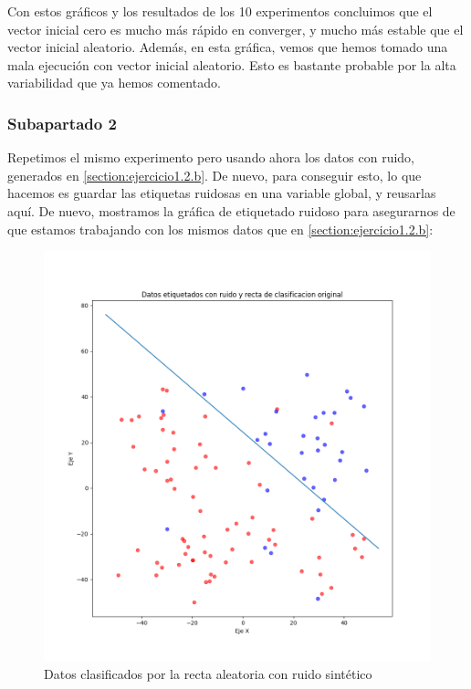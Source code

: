 \documentclass[11pt]{article}
\begin{document}
Con estos gráficos y los resultados de los 10 experimentos concluimos que el vector inicial cero es mucho más rápido en converger, y mucho más estable que el vector inicial aleatorio. Además, en esta gráfica, vemos que hemos tomado una mala ejecución con vector inicial aleatorio. Esto es bastante probable por la alta variabilidad que ya hemos comentado.

\subsubsection{Subapartado 2}

Repetimos el mismo experimento pero usando ahora los datos con ruido, generados en \ref{section:ejercicio1.2.b}. De nuevo, para conseguir esto, lo que hacemos es guardar las etiquetas ruidosas en una variable global, y reusarlas aquí. De nuevo, mostramos la gráfica de etiquetado ruidoso para asegurarnos de que estamos trabajando con los mismos datos que en \ref{section:ejercicio1.2.b}:

\begin{figure}[H]
    \centering
    \includegraphics[scale=0.3]{puntos_clasificados_recta_aleatorizados02}
    \caption{Datos clasificados por la recta aleatoria con ruido sintético}
\end{figure}
\end{document}
